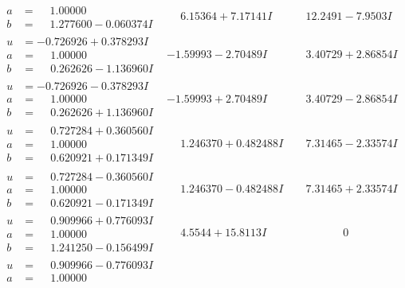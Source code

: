 \documentclass[1p]{elsarticle_modified}
\theoremstyle{definition}
\begin{document}
$$\begin{array}{c|c|c}
\begin{aligned}
a &= \phantom{-}1.00000\phantom{ +0.000000I} \\
b &= \phantom{-}1.277600 - 0.060374 I\end{aligned}
 & \phantom{-}6.15364 + 7.17141 I & \phantom{-}12.2491 - 7.9503 I \\ \hline\begin{aligned}
u &= -0.726926 + 0.378293 I \\
a &= \phantom{-}1.00000\phantom{ +0.000000I} \\
b &= \phantom{-}0.262626 - 1.136960 I\end{aligned}
 & -1.59993 - 2.70489 I & \phantom{-}3.40729 + 2.86854 I \\ \hline\begin{aligned}
u &= -0.726926 - 0.378293 I \\
a &= \phantom{-}1.00000\phantom{ +0.000000I} \\
b &= \phantom{-}0.262626 + 1.136960 I\end{aligned}
 & -1.59993 + 2.70489 I & \phantom{-}3.40729 - 2.86854 I \\ \hline\begin{aligned}
u &= \phantom{-}0.727284 + 0.360560 I \\
a &= \phantom{-}1.00000\phantom{ +0.000000I} \\
b &= \phantom{-}0.620921 + 0.171349 I\end{aligned}
 & \phantom{-}1.246370 + 0.482488 I & \phantom{-}7.31465 - 2.33574 I \\ \hline\begin{aligned}
u &= \phantom{-}0.727284 - 0.360560 I \\
a &= \phantom{-}1.00000\phantom{ +0.000000I} \\
b &= \phantom{-}0.620921 - 0.171349 I\end{aligned}
 & \phantom{-}1.246370 - 0.482488 I & \phantom{-}7.31465 + 2.33574 I \\ \hline\begin{aligned}
u &= \phantom{-}0.909966 + 0.776093 I \\
a &= \phantom{-}1.00000\phantom{ +0.000000I} \\
b &= \phantom{-}1.241250 - 0.156499 I\end{aligned}
 & \phantom{-}4.5544 + 15.8113 I & \phantom{-0.000000 } 0 \\ \hline\begin{aligned}
u &= \phantom{-}0.909966 - 0.776093 I \\
a &= \phantom{-}1.00000\phantom{ +0.000000I} \\

\end{aligned}
\end{array}$$
\end{document}
